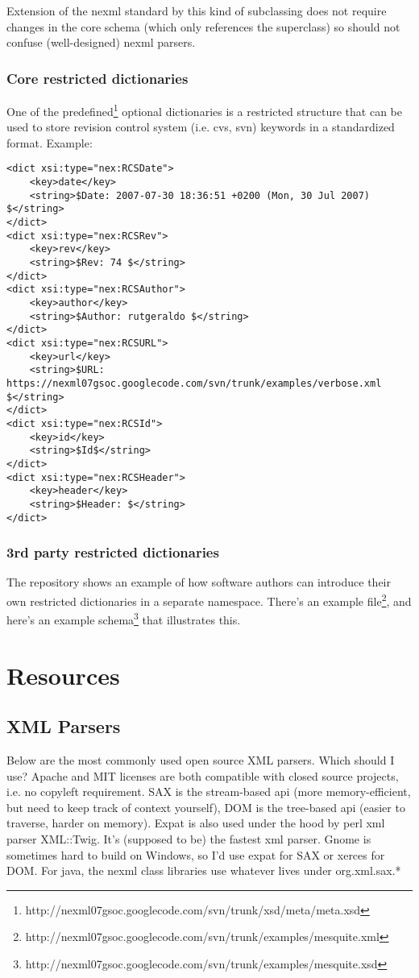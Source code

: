 \documentclass{article}
\begin{document}
Extension of the nexml standard by this kind of subclassing does not
require changes in the core schema (which only references the
superclass) so should not confuse (well-designed) nexml parsers.

\subsubsection{Core restricted dictionaries} One of the
predefined\footnote{http://nexml07gsoc.googlecode.com/svn/trunk/xsd/meta/meta.xsd} 
optional dictionaries is a restricted structure that can be
used to store revision control system (i.e. cvs, svn) keywords in a
standardized format. Example: 
\begin{verbatim} 
<dict xsi:type="nex:RCSDate"> 
    <key>date</key> 
    <string>$Date: 2007-07-30 18:36:51 +0200 (Mon, 30 Jul 2007) $</string> 
</dict> 
<dict xsi:type="nex:RCSRev"> 
    <key>rev</key> 
    <string>$Rev: 74 $</string>
</dict> 
<dict xsi:type="nex:RCSAuthor"> 
    <key>author</key>
    <string>$Author: rutgeraldo $</string> 
</dict> 
<dict xsi:type="nex:RCSURL"> 
    <key>url</key> 
    <string>$URL: https://nexml07gsoc.googlecode.com/svn/trunk/examples/verbose.xml $</string> 
</dict> 
<dict xsi:type="nex:RCSId"> 
    <key>id</key>
    <string>$Id$</string> 
</dict>
<dict xsi:type="nex:RCSHeader"> 
    <key>header</key> 
    <string>$Header: $</string> 
</dict> 
\end{verbatim}

\subsubsection{3rd party restricted dictionaries}

The repository shows an example of how software authors can introduce
their own restricted dictionaries in a separate namespace. There's an
example
file\footnote{http://nexml07gsoc.googlecode.com/svn/trunk/examples/mesquite.xml}, 
and here's an example 
schema\footnote{http://nexml07gsoc.googlecode.com/svn/trunk/examples/mesquite.xsd} 
that illustrates this.

\section{Resources}

\subsection{XML Parsers} Below are the most commonly used open source
XML parsers. Which should I use? Apache and MIT licenses are both
compatible with closed source projects, i.e. no copyleft requirement.
SAX is the stream-based api (more memory-efficient, but need to keep
track of context yourself), DOM is the tree-based api (easier to
traverse, harder on memory). Expat is also used under the hood by perl
xml parser XML::Twig. It's (supposed to be) the fastest xml parser.
Gnome is sometimes hard to build on Windows, so I'd use expat for SAX or
xerces for DOM. For java, the nexml class libraries use whatever lives
under org.xml.sax.*
\end{document}
